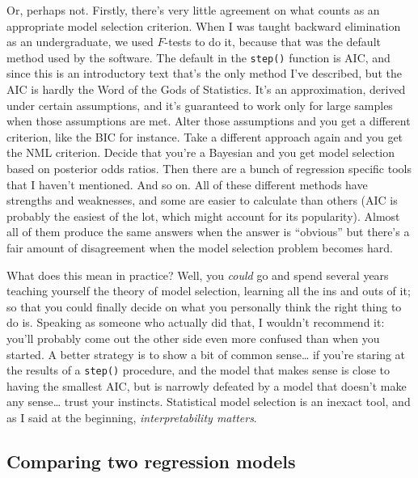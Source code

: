 \documentclass[
]{book}
\begin{document}
Or, perhaps not. Firstly, there's very little agreement on what counts as an appropriate model selection criterion. When I was taught backward elimination as an undergraduate, we used \(F\)-tests to do it, because that was the default method used by the software. The default in the \texttt{step()} function is AIC, and since this is an introductory text that's the only method I've described, but the AIC is hardly the Word of the Gods of Statistics. It's an approximation, derived under certain assumptions, and it's guaranteed to work only for large samples when those assumptions are met. Alter those assumptions and you get a different criterion, like the BIC for instance. Take a different approach again and you get the NML criterion. Decide that you're a Bayesian and you get model selection based on posterior odds ratios. Then there are a bunch of regression specific tools that I haven't mentioned. And so on. All of these different methods have strengths and weaknesses, and some are easier to calculate than others (AIC is probably the easiest of the lot, which might account for its popularity). Almost all of them produce the same answers when the answer is ``obvious'' but there's a fair amount of disagreement when the model selection problem becomes hard.

What does this mean in practice? Well, you \emph{could} go and spend several years teaching yourself the theory of model selection, learning all the ins and outs of it; so that you could finally decide on what you personally think the right thing to do is. Speaking as someone who actually did that, I wouldn't recommend it: you'll probably come out the other side even more confused than when you started. A better strategy is to show a bit of common sense\ldots{} if you're staring at the results of a \texttt{step()} procedure, and the model that makes sense is close to having the smallest AIC, but is narrowly defeated by a model that doesn't make any sense\ldots{} trust your instincts. Statistical model selection is an inexact tool, and as I said at the beginning, \emph{interpretability matters}.

\hypertarget{comparing-two-regression-models}{%
\subsection{Comparing two regression models}\label{comparing-two-regression-models}}
\end{document}
